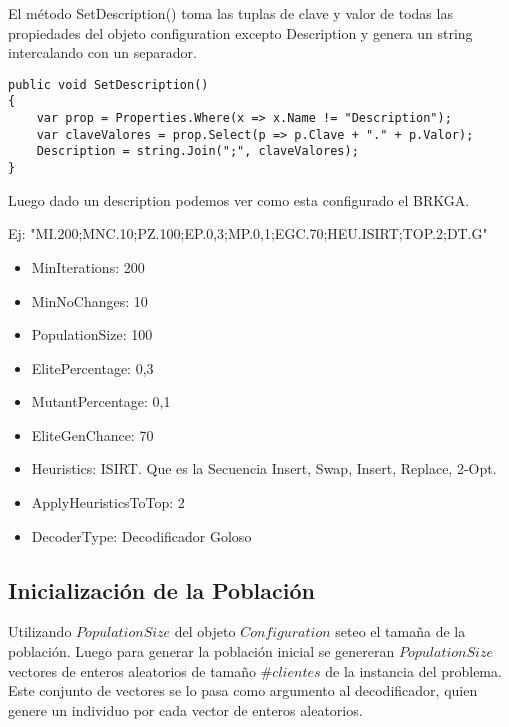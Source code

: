 \bigskip

El método SetDescription() toma las tuplas de clave y valor de todas las propiedades del objeto configuration excepto Description y genera un string intercalando con un separador.

\begin{minipage}{\textwidth}
\begin{lstlisting} 
public void SetDescription()
{ 
	var prop = Properties.Where(x => x.Name != "Description");
	var claveValores = prop.Select(p => p.Clave + "." + p.Valor);
	Description = string.Join(";", claveValores);
}
\end{lstlisting}
\end{minipage}


\begin{minipage}{\textwidth}
Luego dado un description podemos ver como esta configurado el BRKGA.

Ej: "MI.200;MNC.10;PZ.100;EP.0,3;MP.0,1;EGC.70;HEU.ISIRT;TOP.2;DT.G"

\begin{itemize}
  \item MinIterations: 200
  \item MinNoChanges: 10
  \item PopulationSize: 100
  \item ElitePercentage: 0,3
  \item MutantPercentage: 0,1
  \item EliteGenChance: 70
  \item Heuristics: ISIRT. Que es la Secuencia Insert, Swap, Insert, Replace, 2-Opt.
  \item ApplyHeuristicsToTop: 2
  \item DecoderType: Decodificador Goloso
\end{itemize}
\end{minipage}

\subsection{Inicialización de la Población}

Utilizando $PopulationSize$ del objeto $Configuration$ seteo el tamaña de la población. Luego para generar la población inicial se genereran $PopulationSize$ vectores de enteros aleatorios de tamaño $\#clientes$ de la instancia del problema. Este conjunto de vectores se lo pasa como argumento al decodificador, quien genere un individuo por cada vector de enteros aleatorios.

